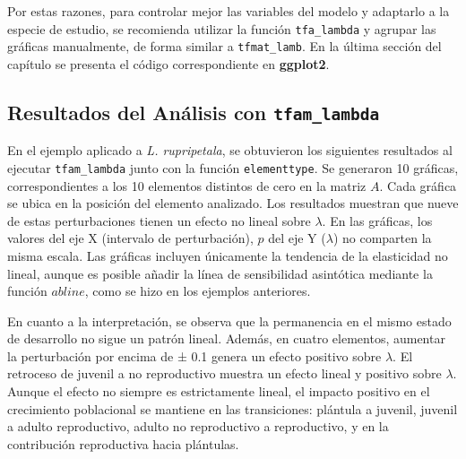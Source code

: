 \documentclass[
  12pt,
  letterpaper,
]{book}
\begin{document}
Por estas razones, para controlar mejor las variables del modelo y
adaptarlo a la especie de estudio, se recomienda utilizar la función
\texttt{tfa\_lambda} y agrupar las gráficas manualmente, de forma
similar a \texttt{tfmat\_lamb}. En la última sección del capítulo se
presenta el código correspondiente en \textbf{ggplot2}.

\subsection{\texorpdfstring{Resultados del Análisis con
\texttt{tfam\_lambda}}{Resultados del Análisis con tfam\_lambda}}\label{resultados-del-anuxe1lisis-con-tfam_lambda}

En el ejemplo aplicado a \emph{L. rupripetala}, se obtuvieron los
siguientes resultados al ejecutar \texttt{tfam\_lambda} junto con la
función \texttt{elementtype}. Se generaron 10 gráficas, correspondientes
a los 10 elementos distintos de cero en la matriz \(A\). Cada gráfica se
ubica en la posición del elemento analizado. Los resultados muestran que
nueve de estas perturbaciones tienen un efecto no lineal sobre
\(\lambda\). En las gráficas, los valores del eje X (intervalo de
perturbación), \(p\) del eje Y (\(\lambda\)) no comparten la misma
escala. Las gráficas incluyen únicamente la tendencia de la elasticidad
no lineal, aunque es posible añadir la línea de sensibilidad asintótica
mediante la función \(abline\), como se hizo en los ejemplos anteriores.

En cuanto a la interpretación, se observa que la permanencia en el mismo
estado de desarrollo no sigue un patrón lineal. Además, en cuatro
elementos, aumentar la perturbación por encima de ± 0.1 genera un efecto
positivo sobre \(\lambda\). El retroceso de juvenil a no reproductivo
muestra un efecto lineal y positivo sobre \(\lambda\). Aunque el efecto
no siempre es estrictamente lineal, el impacto positivo en el
crecimiento poblacional se mantiene en las transiciones: plántula a
juvenil, juvenil a adulto reproductivo, adulto no reproductivo a
reproductivo, y en la contribución reproductiva hacia plántulas.
\end{document}
